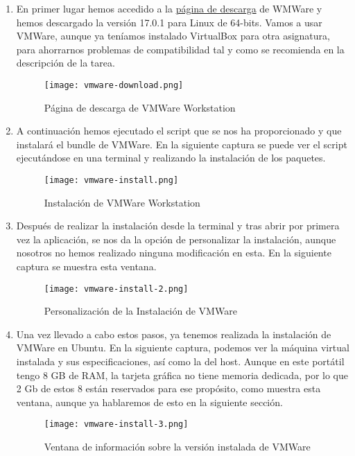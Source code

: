 \begin{enumerate}
    \item En primer lugar hemos accedido a la \href{https://customerconnect.vmware.com/en/downloads/details?downloadGroup=WKST-PLAYER-1701&productId=1377&rPId=100675}{página de descarga} de WMWare y hemos descargado la versión 17.0.1 para Linux de 64-bits. Vamos a usar VMWare, aunque ya teníamos instalado VirtualBox para otra asignatura, para ahorrarnos problemas de compatibilidad tal y como se recomienda en la descripción de la tarea.

    \begin{figure}[H]
        \centering
        \texttt{[image: vmware-download.png]}
        \caption{Página de descarga de VMWare Workstation}
    \end{figure}

    \item A continuación hemos ejecutado el script que se nos ha proporcionado y que instalará el bundle de VMWare. En la siguiente captura se puede ver el script ejecutándose en una terminal y realizando la instalación de los paquetes.

    \begin{figure}[H]
        \centering
        \texttt{[image: vmware-install.png]}
        \caption{Instalación de VMWare Workstation}
    \end{figure}

    \item Después de realizar la instalación desde la terminal y tras abrir por primera vez la aplicación, se nos da la opción de personalizar la instalación, aunque nosotros no hemos realizado ninguna modificación en esta. En la siguiente captura se muestra esta ventana.

    \begin{figure}[H]
        \centering
        \texttt{[image: vmware-install-2.png]}
        \caption{Personalización de la Instalación de VMWare}
    \end{figure}

    \item Una vez llevado a cabo estos pasos, ya tenemos realizada la instalación de VMWare en Ubuntu. En la siguiente captura, podemos ver la máquina virtual instalada y sus especificaciones, así como la del host. Aunque en este portátil tengo 8 GB de RAM, la tarjeta gráfica no tiene memoria dedicada, por lo que 2 Gb de estos 8 están reservados para ese propósito, como muestra esta ventana, aunque ya hablaremos de esto en la siguiente sección.

    \begin{figure}[H]
        \centering
        \texttt{[image: vmware-install-3.png]}
        \caption{Ventana de información sobre la versión instalada de VMWare}
    \end{figure}
\end{enumerate}

